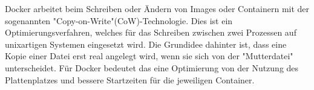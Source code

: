 Docker arbeitet beim Schreiben oder Ändern von Images oder Containern mit der sogenannten "Copy-on-Write"(CoW)-Technologie. Dies ist ein Optimierungsverfahren, welches für das Schreiben zwischen zwei Prozessen auf unixartigen Systemen eingesetzt wird. Die Grundidee dahinter ist, dass eine Kopie einer Datei erst real angelegt wird, wenn sie sich von der "Mutterdatei" unterscheidet. Für Docker bedeutet das eine Optimierung von der Nutzung des Plattenplatzes und bessere Startzeiten für die jeweiligen Container. \cite{LxcVsDocker}
